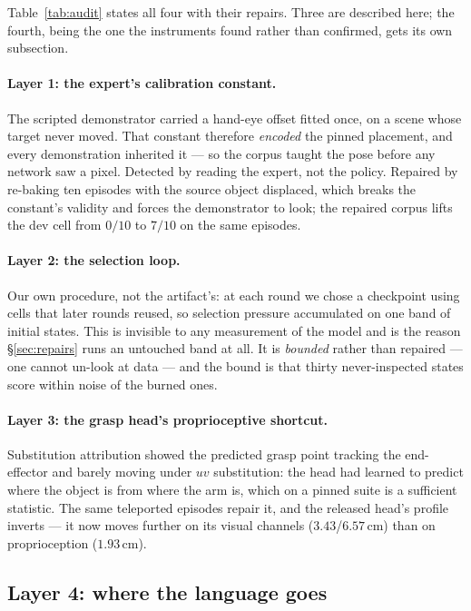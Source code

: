 \documentclass[10pt,twocolumn]{article}
\begin{document}
Table~\ref{tab:audit} states all four with their repairs. Three are described
here; the fourth, being the one the instruments found rather than confirmed,
gets its own subsection.

\paragraph{Layer 1: the expert's calibration constant.} The scripted
demonstrator carried a hand-eye offset fitted once, on a scene whose target
never moved. That constant therefore \emph{encoded} the pinned placement, and
every demonstration inherited it --- so the corpus taught the pose before any
network saw a pixel. Detected by reading the expert, not the policy. Repaired by
re-baking ten episodes with the source object displaced, which breaks the
constant's validity and forces the demonstrator to look; the repaired corpus
lifts the dev cell from $0/10$ to $7/10$ on the same episodes.

\paragraph{Layer 2: the selection loop.} Our own procedure, not the artifact's:
at each round we chose a checkpoint using cells that later rounds reused, so
selection pressure accumulated on one band of initial states. This is invisible
to any measurement of the model and is the reason \S\ref{sec:repairs} runs an
untouched band at all. It is \emph{bounded} rather than repaired --- one cannot
un-look at data --- and the bound is that thirty never-inspected states score
within noise of the burned ones.

\paragraph{Layer 3: the grasp head's proprioceptive shortcut.} Substitution
attribution showed the predicted grasp point tracking the end-effector and
barely moving under $uv$ substitution: the head had learned to predict where the
object is from where the arm is, which on a pinned suite is a sufficient
statistic. The same teleported episodes repair it, and the released head's
profile inverts --- it now moves further on its visual channels
($3.43$/$6.57$\,cm) than on proprioception ($1.93$\,cm).

\subsection{Layer 4: where the language goes}
\label{sec:language}
\end{document}
